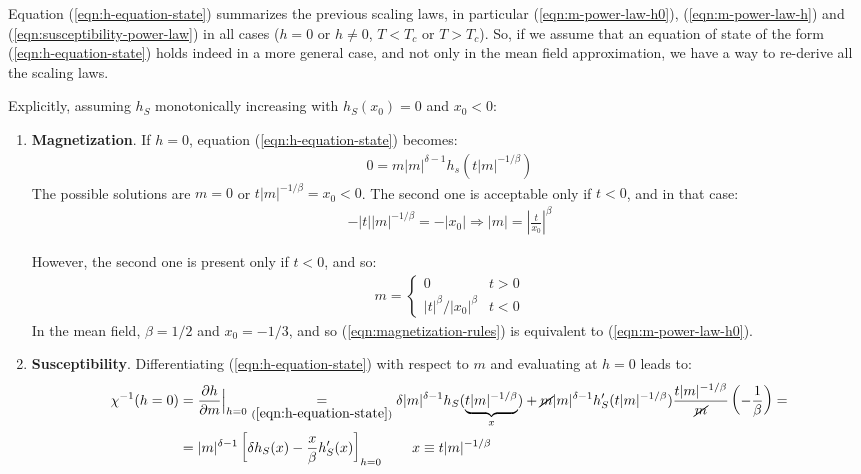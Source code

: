 \documentclass[../../main.tex]{subfiles}
\begin{document}
Equation (\ref{eqn:h-equation-state}) summarizes the previous scaling laws, in particular (\ref{eqn:m-power-law-h0}), (\ref{eqn:m-power-law-h}) and (\ref{eqn:susceptibility-power-law}) in all cases ($h=0$ or $h\neq 0$, $T < T_c$ or $T > T_c$). So, if we assume that an equation of state of the form (\ref{eqn:h-equation-state}) holds indeed in a more general case, and not only in the mean field approximation, we have a way to re-derive all the scaling laws.

\medskip

Explicitly, assuming $h_S$ monotonically increasing with $h_S(x_0) = 0$ and $x_0 < 0$:
\begin{enumerate}
    \item \textbf{Magnetization}. If $h=0$, equation (\ref{eqn:h-equation-state}) becomes:
    \begin{align*}
        0 = m|m|^{\delta-1} h_s(t|m|^{-1/\beta})
    \end{align*}
    The possible solutions are $m=0$ or $t|m|^{-1/\beta} = x_0 < 0$. The second one is acceptable only if $t < 0$, and in that case:
    \begin{align*}
        -|t| |m|^{-1/\beta} = -|x_0| \Rightarrow |m| = \left|\frac{t}{x_0}  \right|^{\beta}
    \end{align*}
    
    However, the second one is present only if $t < 0$, and so:
    \begin{align}
        m = \begin{cases}
            0 & t > 0\\
            |t|^\beta/|x_0|^\beta & t < 0
        \end{cases}%
        \label{eqn:magnetization-rules}
    \end{align} 
    In the mean field, $\beta = 1/2$ and $x_0=-1/3$, and so (\ref{eqn:magnetization-rules}) is equivalent to (\ref{eqn:m-power-law-h0}). 
    \item \textbf{Susceptibility}. Differentiating (\ref{eqn:h-equation-state}) with respect to $m$ and evaluating at $h=0$ leads to:
    \begin{align*}
        \chi^{-1}(h=0) &= \pdv{h}{m}\Big|_{h=0} \underset{(\ref{eqn:h-equation-state})}{=} \delta |m|^{\delta - 1} h_S(\underbrace{ t|m|^{-1/\beta}}_{x}) +\cancel{ m}|m|^{\delta-1}h_S'(t|m|^{-1/\beta})\frac{t|m|^{-1/\beta}}{\cancel{m}} \left(-\frac{1}{\beta} \right) = \\
        &=|m|^{\delta-1}\left[\delta h_S(x) - \frac{x}{\beta} h_S'(x) \right]_{h=0} \qquad x \equiv t|m|^{-1/\beta}
    \end{align*}
    

\end{enumerate}
\end{document}
